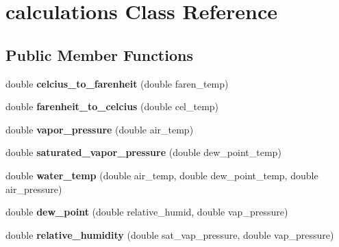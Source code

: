 \hypertarget{classcalculations}{}\section{calculations Class Reference}
\label{classcalculations}
\subsection*{Public Member Functions}
\begin{DoxyCompactItemize}
\item 
\mbox{\label{classcalculations_af034c194e1aac225dd4210b93b8437fe}} 
double {\bfseries celcius\+\_\+to\+\_\+farenheit} (double faren\+\_\+temp)
\item 
\mbox{\label{classcalculations_ab10b39ff1b94a54db267b039703f7dc9}} 
double {\bfseries farenheit\+\_\+to\+\_\+celcius} (double cel\+\_\+temp)
\item 
\mbox{\label{classcalculations_a84b7a97de918305835dc6daea5eea276}} 
double {\bfseries vapor\+\_\+pressure} (double air\+\_\+temp)
\item 
\mbox{\label{classcalculations_a0b1e2a8224889570ccf12f839dcc0f4e}} 
double {\bfseries saturated\+\_\+vapor\+\_\+pressure} (double dew\+\_\+point\+\_\+temp)
\item 
\mbox{\label{classcalculations_a1ac5cde006b41ccf3eb4169244e7f071}} 
double {\bfseries water\+\_\+temp} (double air\+\_\+temp, double dew\+\_\+point\+\_\+temp, double air\+\_\+pressure)
\item 
\mbox{\label{classcalculations_abf4c45e715e32b863bc67340aa89c744}} 
double {\bfseries dew\+\_\+point} (double relative\+\_\+humid, double vap\+\_\+pressure)
\item 
\mbox{\label{classcalculations_a38d24a8af0dd39702bab2888acf2e020}} 
double {\bfseries relative\+\_\+humidity} (double sat\+\_\+vap\+\_\+pressure, double vap\+\_\+pressure)
\end{DoxyCompactItemize}
